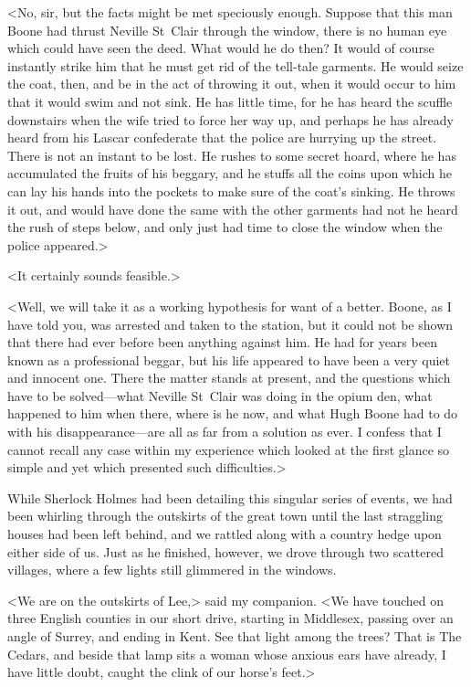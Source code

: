<No, sir, but the facts might be met speciously enough. Suppose that this man Boone had thrust Neville St~Clair through the window, there is no human eye which could have seen the deed. What would he do then? It would of course instantly strike him that he must get rid of the tell-tale garments. He would seize the coat, then, and be in the act of throwing it out, when it would occur to him that it would swim and not sink. He has little time, for he has heard the scuffle downstairs when the wife tried to force her way up, and perhaps he has already heard from his Lascar confederate that the police are hurrying up the street. There is not an instant to be lost. He rushes to some secret hoard, where he has accumulated the fruits of his beggary, and he stuffs all the coins upon which he can lay his hands into the pockets to make sure of the coat's sinking. He throws it out, and would have done the same with the other garments had not he heard the rush of steps below, and only just had time to close the window when the police appeared.>

<It certainly sounds feasible.>

<Well, we will take it as a working hypothesis for want of a better. Boone, as I have told you, was arrested and taken to the station, but it could not be shown that there had ever before been anything against him. He had for years been known as a professional beggar, but his life appeared to have been a very quiet and innocent one. There the matter stands at present, and the questions which have to be solved—what Neville St~Clair was doing in the opium den, what happened to him when there, where is he now, and what Hugh Boone had to do with his disappearance—are all as far from a solution as ever. I confess that I cannot recall any case within my experience which looked at the first glance so simple and yet which presented such difficulties.>

While Sherlock Holmes had been detailing this singular series of events, we had been whirling through the outskirts of the great town until the last straggling houses had been left behind, and we rattled along with a country hedge upon either side of us. Just as he finished, however, we drove through two scattered villages, where a few lights still glimmered in the windows.

<We are on the outskirts of Lee,> said my companion. <We have touched on three English counties in our short drive, starting in Middlesex, passing over an angle of Surrey, and ending in Kent. See that light among the trees? That is The Cedars, and beside that lamp sits a woman whose anxious ears have already, I have little doubt, caught the clink of our horse's feet.>

